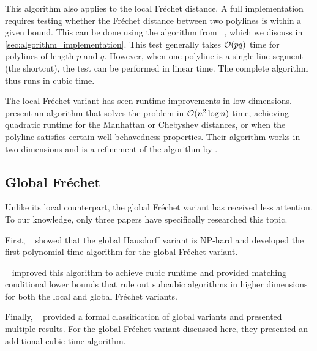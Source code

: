 This algorithm also applies to the local Fréchet distance. A full implementation requires testing whether the Fréchet distance between two polylines is within a given bound. This can be done using the algorithm from \citeauthor{computing_the_frechet_distance_between_two_polygonal_curves}~\cite{computing_the_frechet_distance_between_two_polygonal_curves}, which we discuss in \cref{sec:algorithm_implementation}. This test generally takes \(\mathcal{O}(pq)\) time for polylines of length \(p\) and \(q\). However, when one polyline is a single line segment (the shortcut), the test can be performed in linear time. The complete algorithm thus runs in cubic time.

The local Fréchet variant has seen runtime improvements in low dimensions. \citeauthor{polyline_simplification_under_the_local_frechet_distance_has_almost_quadratic_runtime_in_2d_storandtetal}~\cite{polyline_simplification_under_the_local_frechet_distance_has_almost_quadratic_runtime_in_2d_storandtetal} present an algorithm that solves the problem in \(\mathcal{O}(n^2 \log n)\) time, achieving quadratic runtime for the Manhattan or Chebyshev distances, or when the polyline satisfies certain well-behavedness properties. Their algorithm works in two dimensions and is a refinement of the algorithm by \citeauthor{computing_the_frechet_distance_between_two_polygonal_curves}.

\subsection{Global Fréchet}
Unlike its local counterpart, the global Fréchet variant has received less attention. To our knowledge, only three papers have specifically researched this topic.

First, \citeauthor{on_optimal_polyline_simplification_using_the_hausdorff_and_frechet_distance}~\cite{on_optimal_polyline_simplification_using_the_hausdorff_and_frechet_distance} showed that the global Hausdorff variant is NP-hard and developed the first polynomial-time algorithm for the global Fréchet variant.

\citeauthor{polyline_simplification_has_cubic_complexity_bringmannetal}~\cite{polyline_simplification_has_cubic_complexity_bringmannetal} improved this algorithm to achieve cubic runtime and provided matching conditional lower bounds that rule out subcubic algorithms in higher dimensions for both the local and global Fréchet variants.

Finally, \citeauthor{global_curve_simplification}~\cite{global_curve_simplification} provided a formal classification of global variants and presented multiple results. For the global Fréchet variant discussed here, they presented an additional cubic-time algorithm.


